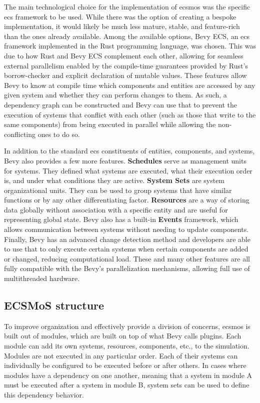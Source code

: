 \documentclass[twoside, 11pt]{article}
\begin{document}
The main technological choice for the implementation of \gls{ecsmos} was the specific \gls{ecs} framework to be used. While there was the option of creating a bespoke implementation, it would likely be much less mature, stable, and feature-rich than the ones already available. Among the available options, Bevy ECS, an \gls{ecs} framework implemented in the Rust programming language, was chosen. This was due to how Rust and Bevy ECS complement each other, allowing for seamless external parallelism enabled by the compile-time guarantees provided by Rust's borrow-checker and explicit declaration of mutable values. These features allow Bevy to know at compile time which components and entities are accessed by any given system and whether they can perform changes to them. As such, a dependency graph can be constructed and Bevy can use that to prevent the execution of systems that conflict with each other (such as those that write to the same components) from being executed in parallel while allowing the non-conflicting ones to do so.

In addition to the standard \gls{ecs} constituents of entities, components, and systems, Bevy also provides a few more features. \textbf{Schedules} serve as management units for systems. They defined what systems are executed, what their execution order is, and under what conditions they are active. \textbf{System Sets} are system organizational units. They can be used to group systems that have similar functions or by any other differentiating factor. \textbf{Resources} are a way of storing data globally without association with a specific entity and are useful for representing global state. Bevy also has a built-in \textbf{Events} framework, which allows communication between systems without needing to update components. Finally, Bevy has an advanced change detection method and developers are able to use that to only execute certain systems when certain components are added or changed, reducing computational load. These and many other features are all fully compatible with the Bevy's parallelization mechanisms, allowing full use of multithreaded hardware.

\subsection{ECSMoS structure}

To improve organization and effectively provide a division of concerns, \gls{ecsmos} is built out of modules, which are built on top of what Bevy calls plugins. Each module can add its own systems, resources, components, etc., to the simulation. Modules are not executed in any particular order. Each of their systems can individually be configured to be executed before or after others. In cases where modules have a dependency on one another, meaning that a system in module A must be executed after a system in module B, system sets can be used to define this dependency behavior.
\end{document}
